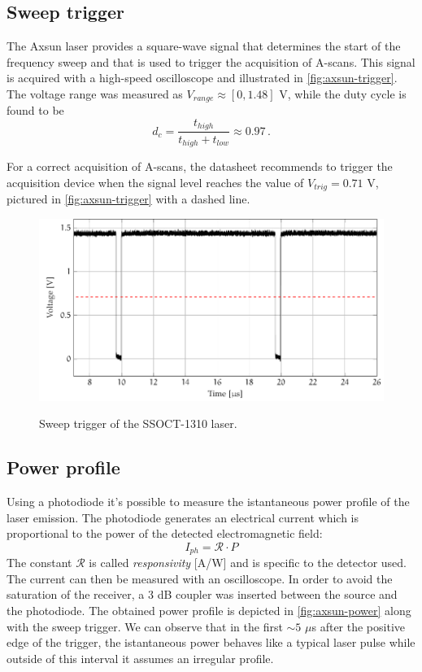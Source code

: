 \subsection{Sweep trigger}
The Axsun laser provides a square-wave signal that determines the start of the frequency sweep  and that is used to trigger the acquisition of A-scans. This signal is acquired with a high-speed oscilloscope and illustrated in \autoref{fig:axsun-trigger}. The voltage range was measured as $V_{range} \approx [0 ,1.48] $ V, while the duty cycle is found to be 
\begin{equation}
	d_c = \frac{t_{high}}{t_{high} + t_{low}} \approx 0.97\,.
\end{equation}

For a correct acquisition of A-scans, the datasheet recommends to trigger the acquisition device when the signal level reaches the value of $V_{trig} = 0.71$ V, pictured in \autoref{fig:axsun-trigger} with a dashed line. 


\begin{figure}[hbt]
	\myfloatalign
	{\includegraphics[width=0.8\linewidth]{gfx/ch3/trigger}}\\
	\caption{Sweep trigger of the SSOCT-1310 laser.}\label{fig:axsun-trigger}
\end{figure}

\subsection{Power profile}
Using a photodiode it's possible to measure the istantaneous power profile of the laser emission. The photodiode generates an electrical current which is proportional to the power of the detected electromagnetic field: 
\begin{equation}
	I_{ph} = \mathcal{R} \cdot P 
\end{equation}
The constant $\mathcal{R}$ is called \emph{responsivity} [A/W] and is specific to the detector used. The current can then be measured with an oscilloscope. In order to avoid the saturation of the receiver, a 3 dB coupler was inserted between the source and the photodiode. The obtained power profile is depicted in \autoref{fig:axsun-power} along with the sweep trigger. We can observe that in the first $\sim 5$ $\mu$s after the positive edge of the trigger, the istantaneous power behaves like a typical laser pulse while outside of this interval it assumes an irregular profile. 


